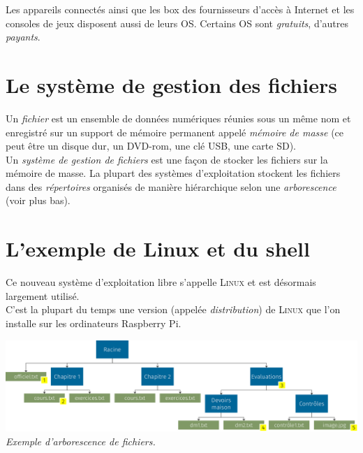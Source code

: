 
	Les appareils connectés ainsi que les \og box \fg{} des fournisseurs d'accès à Internet et les consoles de jeux disposent aussi de leurs OS.
	Certains OS sont \textit{gratuits}, d'autres \textit{payants}.
	
	\section{Le système de gestion des fichiers}
	
	Un \textit{fichier} est un ensemble de données numériques réunies sous un même nom et enregistré sur un support de mémoire permanent appelé \textit{mémoire de masse} (ce peut être un disque dur, un DVD-rom, une clé USB, une carte SD).\\
	Un \textit{système de gestion de fichiers} est une façon de stocker les fichiers sur la mémoire de masse. La plupart des systèmes d'exploitation stockent les fichiers dans des \textit{répertoires} organisés de manière hiérarchique selon une \textit{arborescence} (voir plus bas).

	\section{L'exemple de Linux et du shell}

	\medskip\par
	Ce nouveau système d'exploitation libre s'appelle \textsc{Linux} et est désormais largement utilisé.\\
	C'est la plupart du temps une version (appelée \textit{distribution}) de \textsc{Linux} que l'on installe sur les ordinateurs Raspberry Pi.
	
	\begin{center}
		\includegraphics[width=\textwidth]{ch-sysex/img/hier.png}\\
		\footnotesize\textit{Exemple d'arborescence de fichiers.}
	\end{center}

